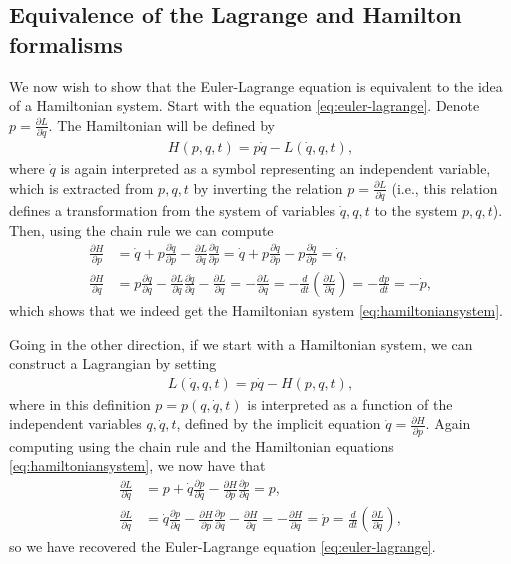 \documentclass[12pt]{amsart}
\newcommand{\eq}[1]{\begin{equation}\begin{split}#1\end{split}\end{equation}}
\newcommand{\eqst}[1]{\begin{align*}#1\end{align*}}
\newcommand{\der}[2]{\frac{d#1}{d#2}}
\newcommand{\pder}[2]{\frac{\partial#1}{\partial#2}}
\begin{document}
\subsection{Equivalence of the Lagrange and Hamilton formalisms}

We now wish to show that the Euler-Lagrange equation is equivalent to the idea of a Hamiltonian system. Start with the equation \eqref{eq:euler-lagrange}. Denote $p=\frac{\partial L}{\partial \dot{q}}$. The Hamiltonian will be defined by
\eq{ \label{eq:hamilton-lagrange}
H(p,q,t) = p\dot{q} - L(\dot{q}, q, t),
}
where $\dot{q}$ is again interpreted as a symbol representing an independent variable, which is extracted from $p, q, t$ by inverting the relation $p=\frac{\partial L}{\partial \dot{q}}$ (i.e., this relation defines a transformation from the system of variables $\dot{q},q,t$ to the system $p,q,t$). Then, using the chain rule we can compute
\eqst{
\pder{H}{p} &= \dot{q} + p \pder{\dot{q}}{p} - \pder{L}{\dot{q}} \pder{\dot{q}}{p} = 
\dot{q} + p \pder{\dot{q}}{p} - p \pder{\dot{q}}{p} = \dot{q}, \\
\pder{H}{q} &= p \pder{\dot{q}}{q} - \pder{L}{\dot{q}}\pder{\dot{q}}{q}-\pder{L}{q} = -\pder{L}{q} =
- \der{}{t} \left( \pder{L}{\dot{q}}\right) = -\der{p}{t} = -\dot{p},
}
which shows that we indeed get the Hamiltonian system \eqref{eq:hamiltoniansystem}.

Going in the other direction, if we start with a Hamiltonian system, we can construct a Lagrangian by setting
\eq{ \label{eq:lagrange-hamilton}
L(\dot{q}, q, t) = p\dot{q} - H(p,q,t),
}
where in this definition $p=p(q,\dot{q},t)$ is interpreted as a function of the independent variables $q, \dot{q}, t$, defined by the implicit equation $\dot{q} = \pder{H}{p}$. Again computing using the chain rule and the Hamiltonian equations \eqref{eq:hamiltoniansystem}, we now have that
\eqst{
\pder{L}{\dot{q}} &= p + \dot{q} \pder{p}{\dot{q}} - \pder{H}{p} \pder{p}{\dot{q}} = p, \\
\pder{L}{q} &= \dot{q}\pder{p}{q}-\pder{H}{p}\pder{p}{q}-\pder{H}{q}=-\pder{H}{q}=\dot{p} = \der{}{t} 
\left( \pder{L}{\dot{q}} \right),
}
so we have recovered the Euler-Lagrange equation \eqref{eq:euler-lagrange}.
\end{document}
